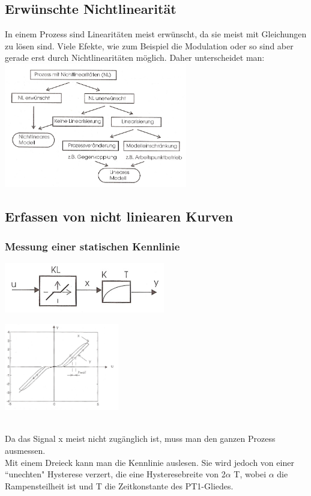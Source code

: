 	\subsection{Erwünschte Nichtlinearität }
		In einem Prozess sind Linearitäten meist erwünscht, da sie meist mit
		Gleichungen zu lösen sind.
		Viele Efekte, wie zum Beispiel die Modulation oder so sind aber gerade erst
		durch Nichtlinearitäten möglich. Daher unterscheidet man:\\
	\includegraphics[width=8cm]{./bilder/Liste_Nichtlinearitaeten.jpg}


	\subsection{Erfassen von nicht liniearen Kurven}
	\subsubsection{Messung einer statischen Kennlinie }
	\begin{minipage}{10cm}
		\includegraphics[width=7cm]{./bilder/NichtlinearMitPT1.jpg}   
    \end{minipage}
	\begin{minipage}{7cm}
    	\includegraphics[width=5cm]{./bilder/NichtlinearMitPT1_dia.jpg}
    \end{minipage}\\
		Da das Signal x meist nicht zugänglich ist, muss man den ganzen Prozess
		ausmessen.\\
		Mit einem Dreieck kann man die Kennlinie auslesen. Sie wird jedoch von einer
		``unechten" Hysterese verzert, die eine Hysteresebreite von 2$\alpha$ T, wobei
		$\alpha$ die Rampensteilheit ist und T die Zeitkonstante des PT1-Gliedes.

